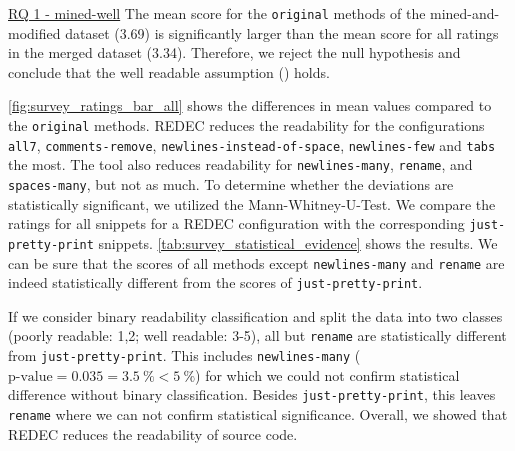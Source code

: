 \documentclass[%
class=scrreprt,
chapterprefix=false,%
open=right,%
twoside=true,%
paper=a4,%
logofile={Logo\_zentral\_farbig\_EN.png},%
thesistype=master,%
UKenglish,%
]{se2thesis}
\theoremstyle{definition}
\newcommand{\rdh}{REDEC\xspace}
\newcommand{\none}{just-pretty-print\xspace} %
\newcommand{\nonet}{\texttt{\none}\xspace} %
\begin{document}
	\begin{summary}{\hyperref[mined-well]{RQ 1 - mined-well}}
		The mean score for the \texttt{original} methods of the mined-and-modified dataset (3.69) is significantly larger than the mean score for all ratings in the merged dataset (3.34). Therefore, we reject the null hypothesis and conclude that the well readable assumption () holds.
	\end{summary}
		
	\begin{sloppypar}
	\autoref{fig:survey_ratings_bar_all} shows the differences in mean values compared to the \texttt{original} methods. \rdh reduces the readability for the configurations \texttt{all7}, \texttt{comments-remove}, \texttt{newlines-instead-of-space}, \texttt{newlines-few} and \texttt{tabs} the most. The tool also reduces readability for \texttt{newlines-many}, \texttt{rename}, and \texttt{spaces-many}, but not as much.
%
	To determine whether the deviations are statistically significant, we utilized the Mann-Whitney-U-Test. We compare the ratings for all snippets for a \rdh configuration with the corresponding \nonet snippets. \autoref{tab:survey_statistical_evidence} shows the results.
    We can be sure that the scores of all methods except \texttt{newlines-many} and \texttt{rename} are indeed statistically different from the scores of \nonet. 
    \end{sloppypar}
	
	If we consider binary readability classification and split the data into two classes (poorly readable: 1,2; well readable: 3-5), all but \texttt{rename} are statistically different from \nonet. This includes \texttt{newlines-many} ($\text{p-value}=0.035=3.5~\% < 5~\%$) for which we could not confirm statistical difference without binary classification.
%
    Besides \nonet, this leaves \texttt{rename} where we can not confirm statistical significance. Overall, we showed that \rdh reduces the readability of source code.
\end{document}
